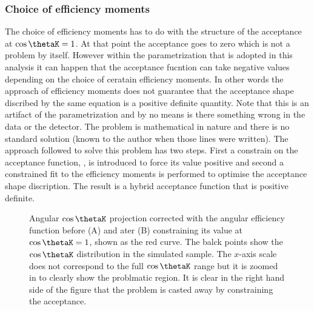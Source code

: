 \subsubsection{Choice of efficiency moments}
The choice of efficiency moments has to do with the structure of the acceptance at $\cos\thetaK=1$. At that point the acceptance goes to zero
which is not a problem by itself. However within the parametrization that is adopted in this analysis it can happen that the acceptance fucntion
 can take negative values depending on the choice of ceratain efficiency moments. In other words the approach of efficiency moments does
not guarantee that the acceptance shape discribed by the same equation is a positive definite quantity. Note that this is an artifact of the parametrization
and by no means is there something wrong in the data or the detector. The problem is mathematical in nature and there is no standard solution (known
to the author when those lines were written). The approach followed to solve this problem has two steps. First a constrain on the acceptance function, , is 
introduced to force its value positive and second a constrained fit to the efficiency moments is performed to optimise the acceptance shape discription.
The result is a hybrid acceptance function that is positive definite.

\begin{figure}[h]
  \centering
  \begin{subfigure}{0.5\textwidth}
    \scalebox{1.3}{}
    \caption{}
    \label{angAcc_nom}
  \end{subfigure}%
  \hfill%
  \begin{subfigure}{0.5\textwidth}
    \scalebox{1.3}{}
    \caption{}
    \label{angAcc_constr_fit}
  \end{subfigure}
  \caption{Angular $\cos\thetaK$ \pdf projection corrected with the angular efficiency function before (A) and ater (B) constraining its value at $\cos\thetaK=1$, shown as the red curve. 
           The balck points show the $\cos\thetaK$ distribution in the simulated sample. The $x$-axis scale does not correspond to the full $\cos\thetaK$ range but it is zoomed in to 
           clearly show the problmatic region. It is clear in the right hand side of the figure that the problem is casted away by constraining the acceptance.
            }
  \label{angAcc_constr}
\end{figure}

